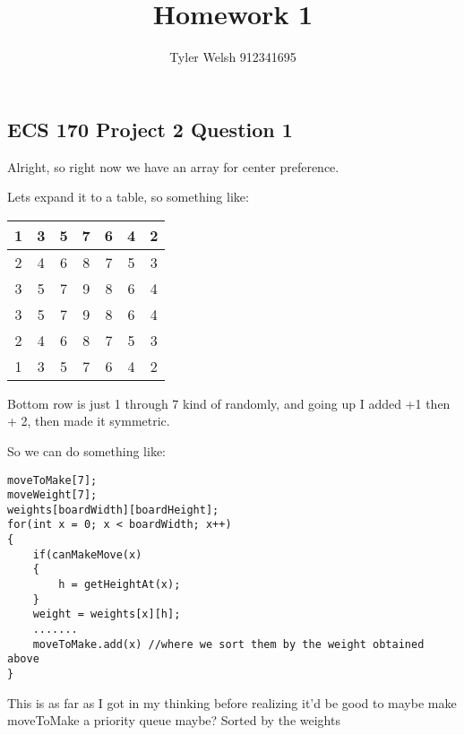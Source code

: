 \documentclass[11pt]{article}  %
\title{\textbf{Homework 1}}
\author{Tyler Welsh 912341695}
\date{}
\begin{document}

\thispagestyle{first}

\begin{center}
\section*{ECS 170 Project 2 Question 1}
\end{center}

Alright, so right now we have an array for center preference.

Lets expand it to a table, so something like:
\begin{center}
\begin{tabular}{|c|c|c|c|c|c|c|}
\hline
1 & 3 & 5 & 7 & 6 & 4 & 2\\
\hline
2 & 4 & 6 & 8 & 7 & 5 & 3\\
\hline
3 & 5 & 7 & 9 & 8 & 6 & 4\\
\hline
3 & 5 & 7 & 9 & 8 & 6 & 4\\
\hline
2 & 4 & 6 & 8 & 7 & 5 & 3\\
\hline
1 & 3 & 5 & 7 & 6 & 4 & 2\\
\hline  
\end{tabular}
\end{center}
Bottom row is just 1 through 7 kind of randomly, and going up I added +1 then + 2, then made it symmetric.

So we can do something like:
\begin{lstlisting}
moveToMake[7];
moveWeight[7];
weights[boardWidth][boardHeight];
for(int x = 0; x < boardWidth; x++)
{
	if(canMakeMove(x)
	{
		h = getHeightAt(x);
	}
	weight = weights[x][h];
	.......
	moveToMake.add(x) //where we sort them by the weight obtained above
}
\end{lstlisting}
This is as far as I got in my thinking before realizing it'd be good to maybe make moveToMake a priority queue maybe? Sorted by the weights
\end{document}
